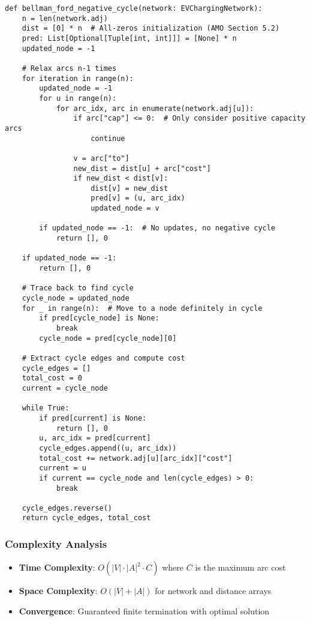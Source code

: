 \documentclass[12pt,a4paper]{article}
\begin{document}
\begin{lstlisting}[caption=Bellman-Ford Implementation]
def bellman_ford_negative_cycle(network: EVChargingNetwork):
    n = len(network.adj)
    dist = [0] * n  # All-zeros initialization (AMO Section 5.2)
    pred: List[Optional[Tuple[int, int]]] = [None] * n
    updated_node = -1
    
    # Relax arcs n-1 times
    for iteration in range(n):
        updated_node = -1
        for u in range(n):
            for arc_idx, arc in enumerate(network.adj[u]):
                if arc["cap"] <= 0:  # Only consider positive capacity arcs
                    continue
                    
                v = arc["to"]
                new_dist = dist[u] + arc["cost"]
                if new_dist < dist[v]:
                    dist[v] = new_dist
                    pred[v] = (u, arc_idx)
                    updated_node = v
        
        if updated_node == -1:  # No updates, no negative cycle
            return [], 0
    
    if updated_node == -1:
        return [], 0
    
    # Trace back to find cycle
    cycle_node = updated_node
    for _ in range(n):  # Move to a node definitely in cycle
        if pred[cycle_node] is None:
            break
        cycle_node = pred[cycle_node][0]
    
    # Extract cycle edges and compute cost
    cycle_edges = []
    total_cost = 0
    current = cycle_node
    
    while True:
        if pred[current] is None:
            return [], 0
        u, arc_idx = pred[current]
        cycle_edges.append((u, arc_idx))
        total_cost += network.adj[u][arc_idx]["cost"]
        current = u
        if current == cycle_node and len(cycle_edges) > 0:
            break
    
    cycle_edges.reverse()
    return cycle_edges, total_cost
\end{lstlisting}

\subsubsection{Complexity Analysis}

\begin{itemize}
\item \textbf{Time Complexity}: $O(|V| \cdot |A|^2 \cdot C)$ where $C$ is the maximum arc cost
\item \textbf{Space Complexity}: $O(|V| + |A|)$ for network and distance arrays  
\item \textbf{Convergence}: Guaranteed finite termination with optimal solution
\end{itemize}
\end{document}
